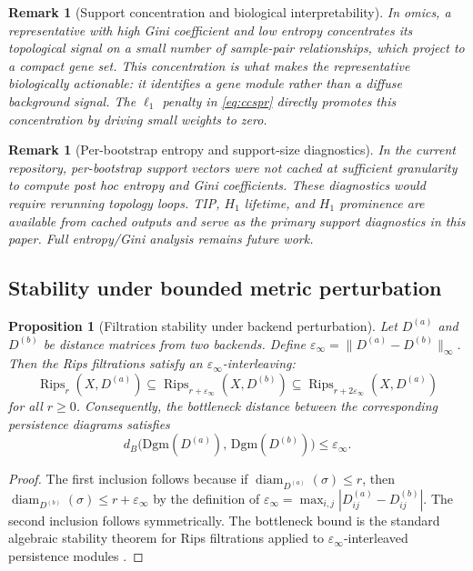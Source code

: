\documentclass[11pt]{article}
\newtheorem{proposition}[theorem]{Proposition}
\newtheorem{remark}[theorem]{Remark}
\DeclareMathOperator{\Rips}{Rips}
\DeclareMathOperator{\diam}{diam}
\begin{document}
\begin{remark}[Support concentration and biological interpretability]\label{rem:concentration}
In omics, a representative with high Gini coefficient and low entropy concentrates its topological signal on a small number of sample-pair relationships, which project to a compact gene set.
This concentration is what makes the representative biologically actionable: it identifies a gene module rather than a diffuse background signal.
The $\ell_1$ penalty in \eqref{eq:ccspr} directly promotes this concentration by driving small weights to zero.
\end{remark}

\begin{remark}[Per-bootstrap entropy and support-size diagnostics]\label{rem:diagnostics_note}
In the current repository, per-bootstrap support vectors were not cached at sufficient granularity to compute post hoc entropy and Gini coefficients.
These diagnostics would require rerunning topology loops.
TIP, $H_1$ lifetime, and $H_1$ prominence are available from cached outputs and serve as the primary support diagnostics in this paper.
Full entropy/Gini analysis remains future work.
\end{remark}

\subsection{Stability under bounded metric perturbation}

\begin{proposition}[Filtration stability under backend perturbation]\label{prop:stability}
Let $D^{(a)}$ and $D^{(b)}$ be distance matrices from two backends.
Define $\varepsilon_\infty = \|D^{(a)} - D^{(b)}\|_\infty$.
Then the Rips filtrations satisfy an $\varepsilon_\infty$-interleaving:
\[
\Rips_r(X, D^{(a)}) \subseteq \Rips_{r + \varepsilon_\infty}(X, D^{(b)}) \subseteq \Rips_{r + 2\varepsilon_\infty}(X, D^{(a)})
\]
for all $r \ge 0$.
Consequently, the bottleneck distance between the corresponding persistence diagrams satisfies
\[
d_B\bigl(\mathrm{Dgm}(D^{(a)}),\, \mathrm{Dgm}(D^{(b)})\bigr) \le \varepsilon_\infty.
\]
\end{proposition}

\begin{proof}
The first inclusion follows because if $\diam_{D^{(a)}}(\sigma) \le r$, then $\diam_{D^{(b)}}(\sigma) \le r + \varepsilon_\infty$ by the definition of $\varepsilon_\infty = \max_{i,j} |D^{(a)}_{ij} - D^{(b)}_{ij}|$.
The second inclusion follows symmetrically.
The bottleneck bound is the standard algebraic stability theorem for Rips filtrations applied to $\varepsilon_\infty$-interleaved persistence modules \cite{chazal2014persistence}.
\end{proof}
\end{document}

